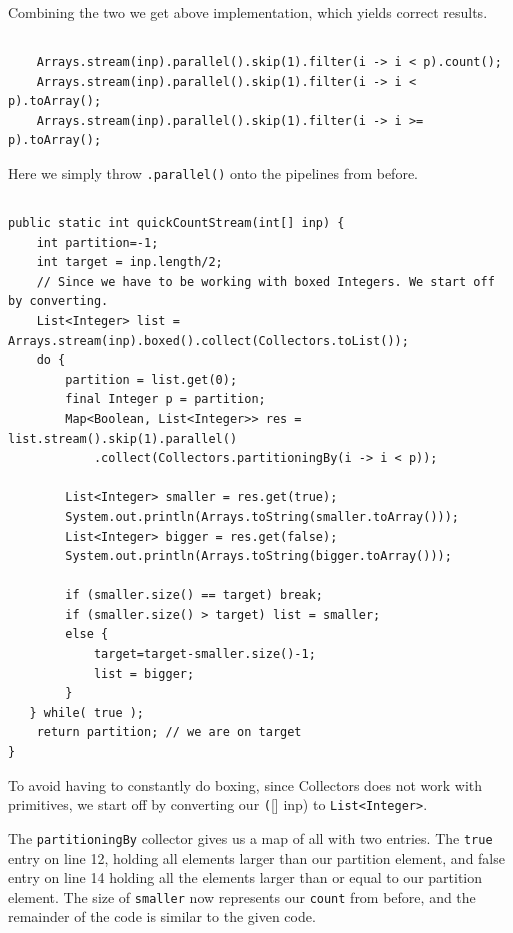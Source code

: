\documentclass[a5paper]{article}
\begin{document}
Combining the two we get above implementation, which yields correct results.

\subsection{}
\begin{lstlisting}
    Arrays.stream(inp).parallel().skip(1).filter(i -> i < p).count();
    Arrays.stream(inp).parallel().skip(1).filter(i -> i < p).toArray();
    Arrays.stream(inp).parallel().skip(1).filter(i -> i >= p).toArray();
\end{lstlisting}
Here we simply throw \texttt{.parallel()} onto the pipelines from before.

\subsection{}

\begin{lstlisting}
public static int quickCountStream(int[] inp) {
    int partition=-1;
    int target = inp.length/2;
    // Since we have to be working with boxed Integers. We start off by converting.
    List<Integer> list = Arrays.stream(inp).boxed().collect(Collectors.toList());
    do {
        partition = list.get(0);
        final Integer p = partition;
        Map<Boolean, List<Integer>> res = list.stream().skip(1).parallel()
            .collect(Collectors.partitioningBy(i -> i < p));

        List<Integer> smaller = res.get(true);
        System.out.println(Arrays.toString(smaller.toArray()));
        List<Integer> bigger = res.get(false);
        System.out.println(Arrays.toString(bigger.toArray()));

        if (smaller.size() == target) break;
        if (smaller.size() > target) list = smaller;
        else {
            target=target-smaller.size()-1;
            list = bigger;
        }
   } while( true );
    return partition; // we are on target
}
\end{lstlisting}
To avoid having to constantly do boxing, since Collectors does not work with primitives,
we start off by converting our \texttt([] inp) to \texttt{List<Integer>}.

The \texttt{partitioningBy} collector gives us a map of all with two entries.
The \texttt{true} entry on line 12, holding all elements larger than our partition element, and false entry on line 14 holding
all the elements larger than or equal to our partition element. The size of \texttt{smaller} now represents our \texttt{count}
from before, and the remainder of the code is similar to the given code.
\end{document}
